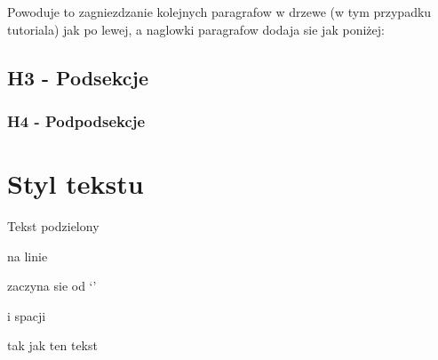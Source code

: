 \documentclass[letterpaper,10pt,english]{sphinxmanual}
\begin{document}
Powoduje to zagniezdzanie kolejnych paragrafow w drzewe (w tym przypadku tutoriala) jak po lewej,
a naglowki paragrafow dodaja sie jak poniżej:


\subsection{H3 - Podsekcje}
\label{\detokenize{tutorial:h3-podsekcje}}

\subsubsection{H4 - Podpodsekcje}
\label{\detokenize{tutorial:h4-podpodsekcje}}

\section{Styl tekstu}
\label{\detokenize{tutorial:styl-tekstu}}
\begin{sphinxVerbatim}[commandchars=\\\{\}]
\end{sphinxVerbatim}

\begin{DUlineblock}{0em}
\item[] 
\item[] 
\end{DUlineblock}

\begin{sphinxVerbatim}[commandchars=\\\{\}]
  
  
    
  
    
   
   
\end{sphinxVerbatim}

\begin{DUlineblock}{0em}
\item[] Tekst podzielony
\item[] na linie
\item[] zaczyna sie od ‘\textbar{}’
\item[] i spacji
\item[] tak jak ten tekst
\end{DUlineblock}
\end{document}
